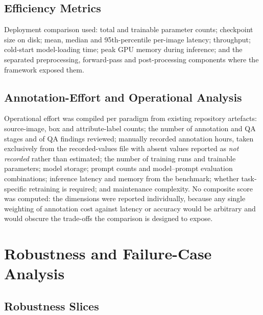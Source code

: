 \subsection{Efficiency Metrics}

Deployment comparison used: total and trainable parameter counts; checkpoint size on disk; mean, median and 95th-percentile per-image latency; throughput; cold-start model-loading time; peak GPU memory during inference; and the separated preprocessing, forward-pass and post-processing components where the framework exposed them.

\subsection{Annotation-Effort and Operational Analysis}

Operational effort was compiled per paradigm from existing repository artefacts: source-image, box and attribute-label counts; the number of annotation and QA stages and of QA findings reviewed; manually recorded annotation hours, taken exclusively from the recorded-values file with absent values reported as \emph{not recorded} rather than estimated; the number of training runs and trainable parameters; model storage; prompt counts and model--prompt evaluation combinations; inference latency and memory from the benchmark; whether task-specific retraining is required; and maintenance complexity. No composite score was computed: the dimensions were reported individually, because any single weighting of annotation cost against latency or accuracy would be arbitrary and would obscure the trade-offs the comparison is designed to expose.

\section{Robustness and Failure-Case Analysis}
\label{sec:robustness-methodology}

\subsection{Robustness Slices}

